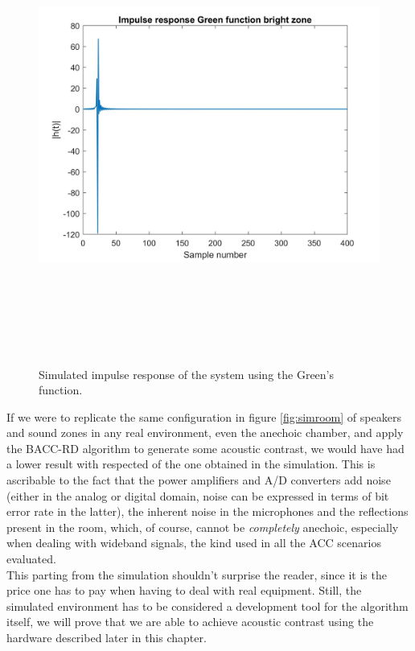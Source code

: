 \begin{figure}[H]
\centering
\includegraphics[width=15cm,height=15cm,keepaspectratio]{Figures/simir}
\decoRule
\caption[Simulated IR]{Simulated impulse response of the system using the Green's function.}
\label{fig:simir}
\end{figure}

If we were to replicate the same configuration in figure \ref{fig:simroom} of speakers and sound zones in any real environment, even the anechoic chamber, and apply the BACC-RD algorithm to generate some acoustic contrast, we would have had a lower result with respected of the one obtained in the simulation. This is ascribable to the fact that the power amplifiers and A/D converters add noise (either in the analog or digital domain, noise can be expressed in terms of bit error rate in the latter), the inherent noise in the microphones and the reflections present in the room, which, of course, cannot be \textit{completely} anechoic, especially when dealing with wideband signals, the kind used in all the ACC scenarios evaluated.
\\
This parting from the simulation shouldn't surprise the reader, since it is the price one has to pay when having to deal with real equipment. Still, the simulated environment has to be considered a development tool for the algorithm itself, we will prove that we are able to achieve acoustic contrast using the hardware described later in this chapter.
\\
